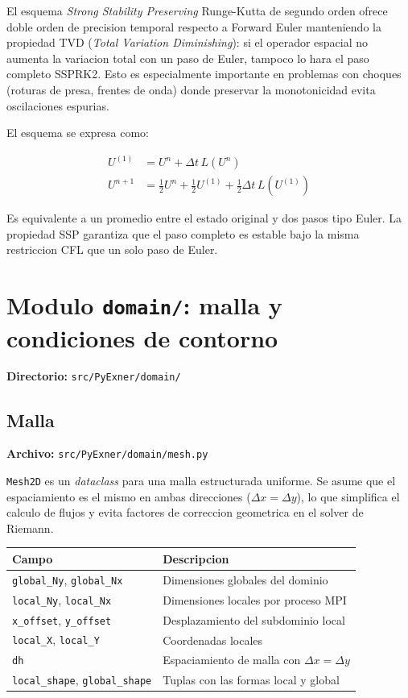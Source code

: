 \documentclass[11pt,a4paper]{article}
\newcommand{\code}[1]{\texttt{#1}}
\begin{document}
El esquema \emph{Strong Stability Preserving} Runge-Kutta de segundo orden ofrece doble orden
de precision temporal respecto a Forward Euler manteniendo la propiedad TVD
(\emph{Total Variation Diminishing}): si el operador espacial no aumenta la variacion total
con un paso de Euler, tampoco lo hara el paso completo SSPRK2. Esto es especialmente importante
en problemas con choques (roturas de presa, frentes de onda) donde preservar la monotonicidad
evita oscilaciones espurias.

El esquema se expresa como:

\begin{align*}
  U^{(1)} &= U^n + \Delta t\,L(U^n) \\
  U^{n+1} &= \frac{1}{2}U^n + \frac{1}{2}U^{(1)} + \frac{1}{2}\Delta t\,L(U^{(1)})
\end{align*}

Es equivalente a un promedio entre el estado original y dos pasos tipo Euler. La propiedad SSP
garantiza que el paso completo es estable bajo la misma restriccion CFL que un solo paso de Euler.

\section{Modulo \code{domain/}: malla y condiciones de contorno}

\textbf{Directorio:} \code{src/PyExner/domain/}

\subsection{Malla}

\textbf{Archivo:} \code{src/PyExner/domain/mesh.py}

\code{Mesh2D} es un \emph{dataclass} para una malla estructurada uniforme. Se asume que el
espaciamiento es el mismo en ambas direcciones ($\Delta x = \Delta y$), lo que simplifica el
calculo de flujos y evita factores de correccion geometrica en el solver de Riemann.

\begin{tabularx}{\textwidth}{L{4cm}Y}
\toprule
Campo & Descripcion \\
\midrule
\code{global\_Ny}, \code{global\_Nx} & Dimensiones globales del dominio \\
\code{local\_Ny}, \code{local\_Nx} & Dimensiones locales por proceso MPI \\
\code{x\_offset}, \code{y\_offset} & Desplazamiento del subdominio local \\
\code{local\_X}, \code{local\_Y} & Coordenadas locales \\
\code{dh} & Espaciamiento de malla con $\Delta x = \Delta y$ \\
\code{local\_shape}, \code{global\_shape} & Tuplas con las formas local y global \\
\bottomrule
\end{tabularx}
\end{document}
